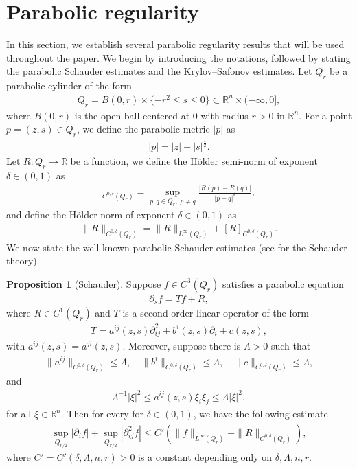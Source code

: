 \documentclass[11pt,reqno]{amsart}
\theoremstyle{definition}
\theoremstyle{bfremark}
\newtheorem{proposition}{Proposition}[section]
\numberwithin{equation}{section}
\begin{document}
\section{Parabolic regularity}
\label{appdx}
In this section, we establish several parabolic regularity results that will be used throughout the paper. We begin by introducing the notations, followed by stating the parabolic Schauder estimates and the Krylov–Safonov estimates. Let \(Q_r\) be a parabolic cylinder of the form
\begin{align*}
    Q_r=B(0,r) \times \{-r^2 \leq s \leq 0\} \subset \mathbb{R}^n \times (-\infty,0],
\end{align*}
where \(B(0,r)\) is the open ball centered at 0 with radius \(r>0\) in \(\mathbb{R}^n\). For a point \(p=(z,s) \in Q_r\), we define the parabolic metric \(|p|\) as 
\begin{align*}
    |p|=|z|+|s|^{\frac{1}{2}}.
\end{align*}
Let \(R:Q_r \to \mathbb{R}\) be a function, we define the H\"older semi-norm of exponent \(\delta \in (0,1)\) as
\begin{align*}
    [R]_{C^{0,\delta}(Q_r)}=\sup_{p,q \in Q_r,\;p \neq q} \frac{|R(p)-R(q)|}{|p-q|^{\delta}},
\end{align*}
and define the H\"older norm of exponent \(\delta \in (0,1)\) as
\begin{align*}
    \|R\|_{C^{0,\delta}(Q_r)} = \|R\|_{L^{\infty}(Q_r)}+[R]_{C^{0,\delta}(Q_r)}. 
\end{align*}
We now state the well-known parabolic Schauder estimates (see \cite{krylov1996lectures} for the Schauder theory).
\begin{proposition}[Schauder]
\label{prop:Schauder}
    Suppose \(f\in C^3(Q_r)\) satisfies a parabolic equation
    \begin{align*}
        \partial_sf=Tf+R,
    \end{align*}
    where \(R \in C^1(Q_r)\) and \(T\) is a second order linear operator of the form
    \begin{align*}
       T=a^{ij}(z,s)\partial^2_{ij}+b^i(z,s)\partial_i+c(z,s),
    \end{align*}
    with \(a^{ij}(z,s)=a^{ji}(z,s)\). Moreover, suppose there is \(\Lambda>0\) such that
    \begin{align*}
        \|a^{ij}\|_{C^{0,\delta}(Q_r)} \leq \Lambda, \quad \|b^i\|_{C^{0,\delta}(Q_r)} \leq \Lambda, \quad \|c\|_{C^{0,\delta}(Q_r)} \leq \Lambda,
    \end{align*}
    and 
    \begin{align*}
        \Lambda^{-1}|\xi|^2 \leq a^{ij}(z,s)\xi_i \xi_j \leq \Lambda|\xi|^2,
    \end{align*}
    for all \(\xi \in \mathbb{R}^n\). Then for every for \(\delta \in (0,1)\), we have the following estimate
\begin{align*}
    \sup_{Q_{r/2}}|\partial_if|+\sup_{Q_{r/2}}|\partial^2_{ij} f| \leq C'\left(\|f\|_{L^{\infty}(Q_{r})}+\|R\|_{C^{0,\delta}(Q_{r})}\right),
\end{align*}
where \(C'=C'(\delta, \Lambda,n,r)>0\) is a constant depending only on \(\delta, \Lambda, n,r\).
\end{proposition}
\end{document}
